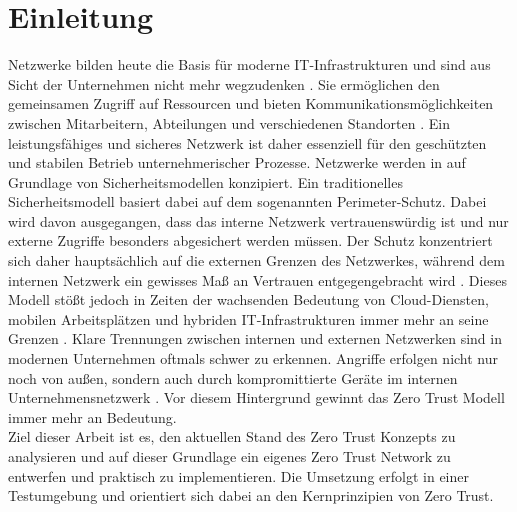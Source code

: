 \documentclass[lettersize,journal]{IEEEtran}
\begin{document}
\section{Einleitung}
Netzwerke bilden heute die Basis für moderne IT-Infrastrukturen und sind aus Sicht der Unternehmen nicht mehr wegzudenken \cite{Afolalu_Tsoeu_2025}. Sie ermöglichen den gemeinsamen Zugriff auf Ressourcen und bieten Kommunikationsmöglichkeiten zwischen Mitarbeitern, Abteilungen und verschiedenen Standorten \cite[3]{schreiner2023computernetzwerke}. Ein leistungsfähiges und sicheres Netzwerk ist daher essenziell für den geschützten und stabilen Betrieb unternehmerischer Prozesse. 
Netzwerke werden in auf Grundlage von Sicherheitsmodellen konzipiert. Ein traditionelles Sicherheitsmodell basiert dabei auf dem sogenannten Perimeter-Schutz. Dabei wird davon ausgegangen, dass das interne Netzwerk vertrauenswürdig ist und nur externe Zugriffe besonders abgesichert werden müssen. Der Schutz konzentriert sich daher hauptsächlich auf die externen Grenzen des Netzwerkes, während dem internen Netzwerk ein gewisses Maß an Vertrauen entgegengebracht wird \cite{cloudflare2025castle}.
Dieses Modell stößt jedoch in Zeiten der wachsenden Bedeutung von Cloud-Diensten, mobilen Arbeitsplätzen und hybriden IT-Infrastrukturen immer mehr an seine Grenzen \cite[29]{Riepen.2022}. Klare Trennungen zwischen internen und externen Netzwerken sind in modernen Unternehmen oftmals schwer zu erkennen. Angriffe erfolgen nicht nur noch von außen, sondern auch durch kompromittierte Geräte im internen Unternehmensnetzwerk \cite[2809-2810]{horne2025zero}. Vor diesem Hintergrund gewinnt das Zero Trust Modell immer mehr an Bedeutung.\\
Ziel dieser Arbeit ist es, den aktuellen Stand des Zero Trust Konzepts zu analysieren und auf dieser Grundlage ein eigenes Zero Trust Network zu entwerfen und praktisch zu implementieren. Die Umsetzung erfolgt in einer Testumgebung und orientiert sich dabei an den Kernprinzipien von Zero Trust.
\end{document}
